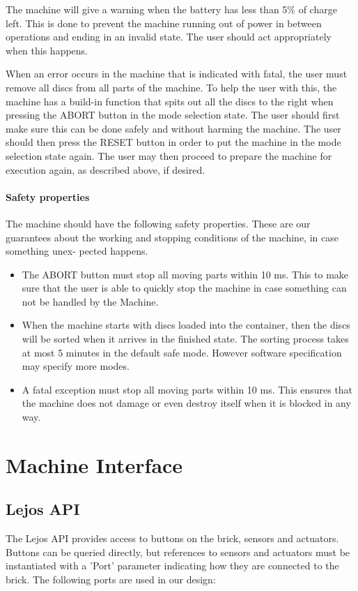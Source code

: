 \documentclass[a4paper,oneside,11pt]{article}
\begin{document}
The machine will give a warning when the battery has less than 5\% of charge left. This
is done to prevent the machine running out of power in between operations and ending in an
invalid state. The user should act appropriately when this happens.

When an error occurs in the machine that is indicated with fatal, the user must remove all
discs from all parts of the machine. To help the user with this, the machine has a build-in function that spits out all the discs to the right when pressing the ABORT  button in the mode selection state. The user should first make sure this can be done safely and without harming the machine. The user should then press the RESET button in order
to put the machine in the mode selection state again. The user may then proceed to prepare the machine for
execution again, as described above, if desired.

\paragraph{Safety properties}
The machine should have the following safety properties. These are our
guarantees about the working and stopping conditions of the machine, in case something unex-
pected happens.

\begin{itemize}
	\item The ABORT button must stop all moving parts within 10 ms. This to make sure that the user is able to quickly stop the machine in case something can not be handled by the Machine.
	\item When the machine starts with discs loaded into the container, then the discs will be sorted
when it arrives in the finished state. The sorting process takes at most 5 minutes in the
default safe mode. However software specification may specify more modes.
	\item A fatal exception must stop all moving parts within 10 ms. This ensures that the machine
does not damage or even destroy itself when it is blocked in any way.
\end{itemize}

\section{Machine Interface}
\subsection{Lejos API}
The Lejos API provides access to buttons on the brick, sensors and actuators.
Buttons can be queried directly, but references to sensors and actuators must be instantiated
with a ’Port’ parameter indicating how they are connected to the brick. The following ports
are used in our design:
\end{document}
